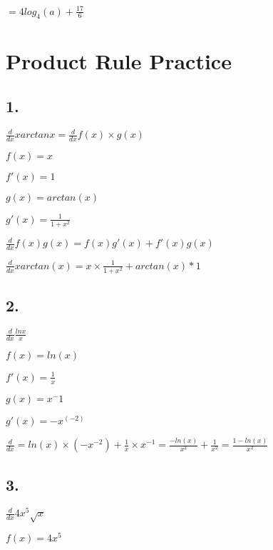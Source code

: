\documentclass[12pt,a4paper]{article}
\begin{document}
\noindent $= \boxed{4log_{4}(a) + \frac{17}{6}}$



\newpage

\section*{Product Rule Practice}

\subsection*{1.}

$\frac{d}{dx} x arctan x = \frac{d}{dx} f(x) \times g(x)$
\newline

\noindent $f(x) = x$

\noindent $f'(x) = 1$

\noindent $g(x) = arctan (x)$

\noindent $g'(x) = \frac{1}{1 + x^2}$
\newline

\noindent $\frac{d}{dx} f(x)g(x) = f(x)g'(x) + f'(x)g(x)$

\noindent $\frac{d}{dx} x arctan(x) = x \times \frac{1}{1 + x^2} + arctan(x) * 1$



\subsection*{2.}

\noindent $\frac{d}{dx} \frac{ln x}{x}$
\newline

\noindent $f(x) = ln(x)$

\noindent $f'(x) = \frac{1}{x}$

\noindent $g(x) = x^-1$

\noindent $g'(x) = -x^(-2)$
\newline

\noindent $\frac{d}{dx} = ln(x) \times (-x^{-2}) + \frac{1}{x} \times x^{-1} = \frac{-ln(x)}{x^2} + \frac{1}{x^2} = \frac{1 - ln(x)}{x^2}$

\subsection*{3.}

\noindent $\frac{d}{dx} 4x^5 \sqrt{x}$
\newline

\noindent $f(x) = 4x^5$
\end{document}
